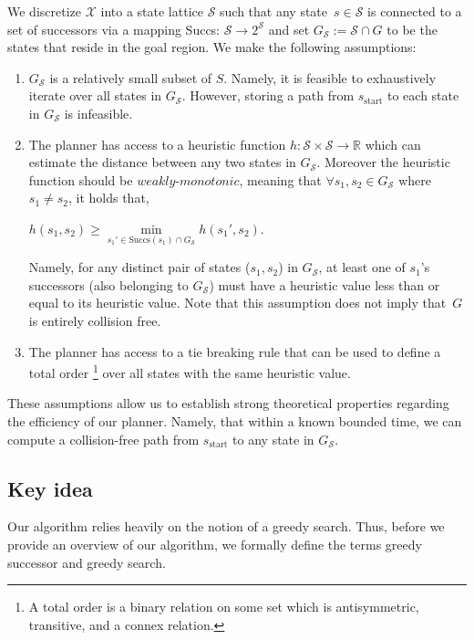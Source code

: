 \documentclass[letterpaper]{article} %
\newcommand{\calX}{\ensuremath{\mathcal{X}}\xspace}
\newcommand{\calS}{\ensuremath{\mathcal{S}}\xspace}
\newcommand{\sStart}{\ensuremath{s_{\text{start}}\xspace}}
\begin{document}
We discretize $\calX$ into a state lattice $\calS$ such that any state~$s \in \calS$ is connected to a set of successors via a mapping Succs: $\calS \rightarrow 2^\calS$
and set $G_\calS := \calS \cap G$ to be the states that reside in the goal region.
We make the following assumptions:

\begin{enumerate}[label={\textbf{A\arabic*}}]
  \item \label{assum:1} $G_\calS$ is a relatively small subset of $S$. Namely, it is feasible to exhaustively iterate over all states in $G_\calS$.
However, storing a path from $\sStart$ to each state in $G_\calS$ is infeasible.
  
  \item \label{assum:2} The planner has access to a heuristic function $h: \calS \times \calS \rightarrow \mathbb{R}$ which can estimate the distance between any two states in $G_\calS$. Moreover the heuristic function should be $\textit{weakly-monotonic}$, meaning that $\forall s_1, s_2  \in G_\calS$ where $s_1 \neq s_2 $, it holds that,

  \begin{center}
    $h(s_1, s_2) \geq \min\limits_{s_1' \in \text{Succs}(s_1) \cap G_\calS} h(s_1', s_2)$.
  \end{center}
  Namely, for any distinct pair of states ($s_1, s_2$) in $G_\calS$, at least one of $s_1$'s successors (also belonging to $G_\calS$) must have a heuristic value less than or equal to its heuristic value.
	Note that this assumption does not imply  that~$G$ is entirely collision free.

  \item \label{assum:3} The planner has access to a tie breaking rule that can be used to define a total order \footnote{A total order is a binary relation on some set which is antisymmetric, transitive, and a connex relation.} over all states with the same heuristic value.
  \end{enumerate}

These assumptions allow us to establish strong theoretical properties regarding the efficiency of our planner. Namely, that
within a known bounded time, we can compute a collision-free path from $\sStart$ to any state in $G_\calS$. 

\subsection{Key idea}
\label{sec:key}
Our algorithm relies heavily on the notion of a greedy search.  Thus, before we provide an overview of our algorithm, we formally define the terms greedy successor and greedy search.
\end{document}
